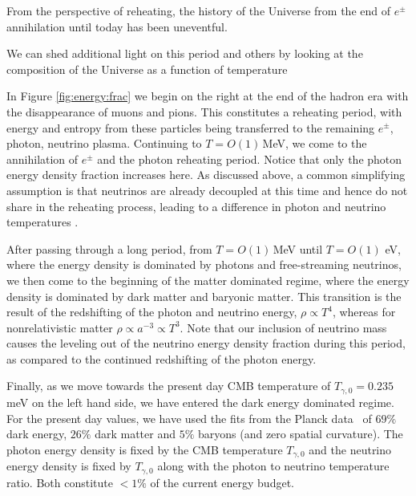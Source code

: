From the perspective of reheating, the history of the Universe from the end of $e^\pm$ annihilation until today has been uneventful. 

We can shed additional light on this period and others by looking at the composition of the Universe as a function of temperature


In Figure \ref{fig:energy:frac} we begin on the right at the end of the hadron era with the disappearance of muons and pions. This constitutes a reheating period, with energy and entropy from these particles being transferred to the remaining $e^\pm$, photon, neutrino plasma. Continuing to $T=O(1)$\,MeV, we come to the annihilation of $e^\pm$ and the photon reheating period. Notice that only the photon energy density fraction increases here. As discussed above, a common simplifying assumption is that neutrinos are already decoupled at this time and hence do not share in the reheating process, leading to a difference in photon and neutrino temperatures .

After passing through a long period, from $T=O(1)$\,MeV until $T=O(1)$ eV, where the energy density is dominated by photons and free-streaming neutrinos, we then come to the beginning of the matter dominated regime, where the energy density is dominated by dark matter and baryonic matter. This transition is the result of the redshifting of the photon and neutrino energy, $\rho\propto T^4$, whereas for nonrelativistic matter $\rho\propto a^{-3}\propto T^3$. Note that our inclusion of neutrino mass causes the leveling out of the neutrino energy density fraction during this period, as compared to the continued redshifting of the photon energy.

Finally, as we move towards the present day CMB temperature of $T_{\gamma,0}=0.235$ meV on the left hand side, we have entered the dark energy dominated regime. For the present day values, we have used the fits from the Planck data~\cite{Planck:2018vyg,Planck:2015fie,Planck:2013pxb} of $69\%$ dark energy, $26\%$ dark matter and $5\%$ baryons (and zero spatial curvature). The photon energy density is fixed by the CMB temperature $T_{\gamma,0}$ and the neutrino energy density is fixed by $T_{\gamma,0}$ along with the photon to neutrino temperature ratio. Both constitute $<1\%$ of the current energy budget.

